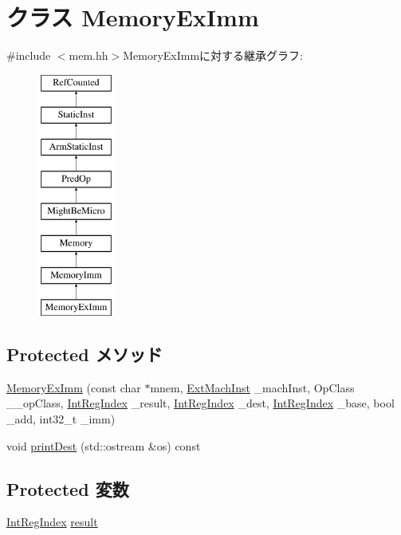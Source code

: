 \hypertarget{classArmISA_1_1MemoryExImm}{
\section{クラス MemoryExImm}
\label{classArmISA_1_1MemoryExImm}
}


{\ttfamily \#include $<$mem.hh$>$}MemoryExImmに対する継承グラフ:\begin{figure}[H]
\begin{center}
\leavevmode
\includegraphics[height=8cm]{classArmISA_1_1MemoryExImm}
\end{center}
\end{figure}
\subsection*{Protected メソッド}
\begin{DoxyCompactItemize}
\item 
\hyperlink{classArmISA_1_1MemoryExImm_a1d60bca042fa925db60bbda138d6a60a}{MemoryExImm} (const char $\ast$mnem, \hyperlink{classStaticInst_a5605d4fc727eae9e595325c90c0ec108}{ExtMachInst} \_\-machInst, OpClass \_\-\_\-opClass, \hyperlink{namespaceArmISA_ae64680ba9fb526106829d6bf92fc791b}{IntRegIndex} \_\-result, \hyperlink{namespaceArmISA_ae64680ba9fb526106829d6bf92fc791b}{IntRegIndex} \_\-dest, \hyperlink{namespaceArmISA_ae64680ba9fb526106829d6bf92fc791b}{IntRegIndex} \_\-base, bool \_\-add, int32\_\-t \_\-imm)
\item 
void \hyperlink{classArmISA_1_1MemoryExImm_adee5df6e5d6b0c498363aabda42431fa}{printDest} (std::ostream \&os) const 
\end{DoxyCompactItemize}
\subsection*{Protected 変数}
\begin{DoxyCompactItemize}
\item 
\hyperlink{namespaceArmISA_ae64680ba9fb526106829d6bf92fc791b}{IntRegIndex} \hyperlink{classArmISA_1_1MemoryExImm_a43f8ecc8130e5285e0ae2134151d6d6a}{result}
\end{DoxyCompactItemize}


